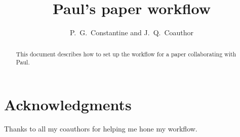 \documentclass[times]{nmeauth}
\begin{document}

\title{Paul's paper workflow\footnotemark[2]}

\author{
P.~G.~Constantine\corrauth 
and 
J.~Q.~Coauthor
}


\address{%
Department of Applied Mathematics and Statistics, Colorado School of Mines, Golden, CO
\break 
{}Department of Something, University of Somewhere, USA
}

\begin{abstract}
This document describes how to set up the workflow for a paper collaborating with Paul.
\end{abstract}


\maketitle


\vspace{-6pt}






\section*{Acknowledgments}
Thanks to all my coauthors for helping me hone my workflow.



\end{document}
